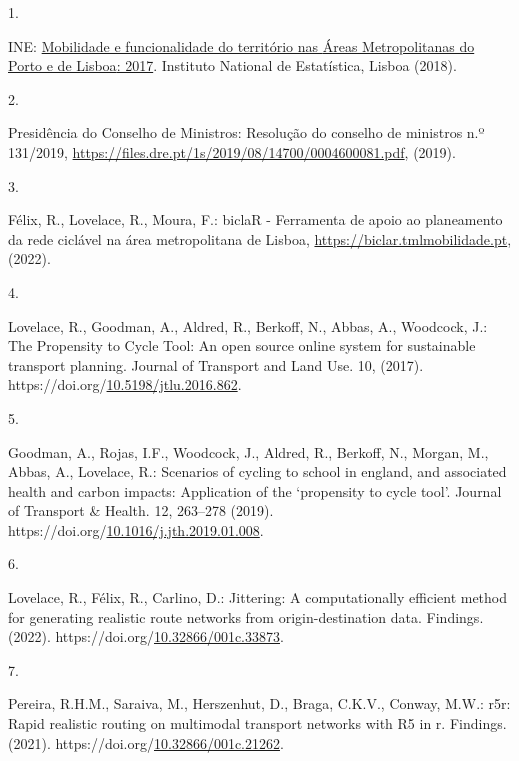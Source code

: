 \documentclass[runningheads]{llncs}
\newlength{\cslhangindent}
\newlength{\csllabelwidth}
\newlength{\cslentryspacingunit} %
\newenvironment{CSLReferences}[2] %
 {%
  \setlength{\parindent}{0pt}
  \ifodd #1
  \let\oldpar\par
  \def\par{\hangindent=\cslhangindent\oldpar}
  \fi
  \setlength{\parskip}{#2\cslentryspacingunit}
 }%
 {}
\newcommand{\CSLLeftMargin}[1]{\parbox[t]{\csllabelwidth}{#1}}
\newcommand{\CSLRightInline}[1]{\parbox[t]{\linewidth - \csllabelwidth}{#1}\break}
\begin{document}
\hypertarget{refs}{}
\begin{CSLReferences}{0}{0}
\leavevmode{}%
\CSLLeftMargin{1. }%
\CSLRightInline{INE:
\href{https://www.ine.pt/xportal/xmain?xpid=INE\&xpgid=ine_publicacoes\&PUBLICACOESpub_boui=349495406\&PUBLICACOESmodo=2\&xlang=pt}{Mobilidade
e funcionalidade do território nas {Áreas Metropolitanas do Porto e de
Lisboa}: 2017}. {Instituto National de Estatística}, Lisboa (2018).}

\leavevmode{}%
\CSLLeftMargin{2. }%
\CSLRightInline{Presidência do Conselho de Ministros: Resolução do
conselho de ministros n.º 131/2019,
\url{https://files.dre.pt/1s/2019/08/14700/0004600081.pdf}, (2019).}

\leavevmode{}%
\CSLLeftMargin{3. }%
\CSLRightInline{Félix, R., Lovelace, R., Moura, F.: {biclaR - Ferramenta
de apoio ao planeamento da rede ciclável na área metropolitana de
Lisboa}, \url{https://biclar.tmlmobilidade.pt}, (2022).}

\leavevmode{}%
\CSLLeftMargin{4. }%
\CSLRightInline{Lovelace, R., Goodman, A., Aldred, R., Berkoff, N.,
Abbas, A., Woodcock, J.: The Propensity to Cycle Tool: An open source
online system for sustainable transport planning. Journal of Transport
and Land Use. 10, (2017).
https://doi.org/\href{https://doi.org/10.5198/jtlu.2016.862}{10.5198/jtlu.2016.862}.}

\leavevmode{}%
\CSLLeftMargin{5. }%
\CSLRightInline{Goodman, A., Rojas, I.F., Woodcock, J., Aldred, R.,
Berkoff, N., Morgan, M., Abbas, A., Lovelace, R.: Scenarios of cycling
to school in england, and associated health and carbon impacts:
Application of the {`}propensity to cycle tool{'}. Journal of Transport
\& Health. 12, 263--278 (2019).
https://doi.org/\href{https://doi.org/10.1016/j.jth.2019.01.008}{10.1016/j.jth.2019.01.008}.}

\leavevmode{}%
\CSLLeftMargin{6. }%
\CSLRightInline{Lovelace, R., Félix, R., Carlino, D.: Jittering: A
computationally efficient method for generating realistic route networks
from origin-destination data. Findings. (2022).
https://doi.org/\href{https://doi.org/10.32866/001c.33873}{10.32866/001c.33873}.}

\leavevmode{}%
\CSLLeftMargin{7. }%
\CSLRightInline{Pereira, R.H.M., Saraiva, M., Herszenhut, D., Braga,
C.K.V., Conway, M.W.: r5r: Rapid realistic routing on multimodal
transport networks with R5 in r. Findings. (2021).
https://doi.org/\href{https://doi.org/10.32866/001c.21262}{10.32866/001c.21262}.}


\end{CSLReferences}
\end{document}
